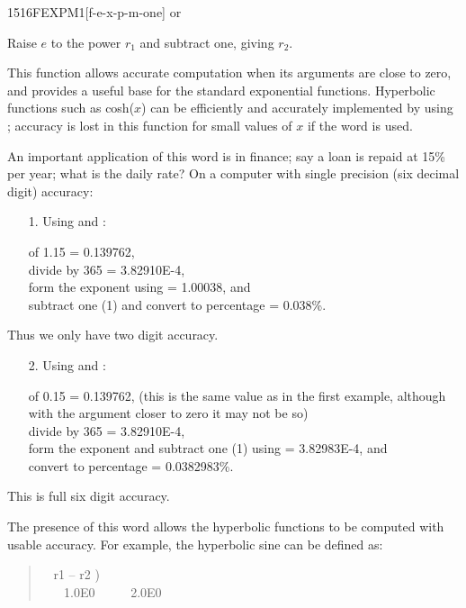 \begin{newword}{1516}{FEXPM1}[f-e-x-p-m-one]
	 or

	Raise $e$ to the power $r_1$ and subtract one, giving $r_2$.

	\begin{rationale} %
		This function allows accurate computation when its arguments
		are close to zero, and provides a useful base for the standard
		exponential functions. Hyperbolic functions such as
		\textsf{cosh($x$)} can be efficiently and accurately
		implemented by using ; accuracy is lost in this
		function for small values of $x$ if the word  is
		used.

		An important application of this word is in finance; say a loan
		is repaid at 15\% per year; what is the daily rate? On a computer
		with single precision (six decimal digit) accuracy:

		\begin{enumerate}
		\item[1.] Using  and :

			 of 1.15 = 0.139762, \\
			divide by 365 = 3.82910E-4, \\
			form the exponent using  = 1.00038, and \\
			subtract one (1) and convert to percentage = 0.038\%.
		\end{enumerate}
		Thus we only have two digit accuracy.
		\begin{enumerate}
		\item[2.] Using  and :

			 of 0.15 = 0.139762, (this is the same value
			as in the first example, although with the argument closer
			to zero it may not be so) \\
			divide by 365 = 3.82910E-4, \\
			form the exponent and subtract one (1) using
			 = 3.82983E-4, and \\
			convert to percentage = 0.0382983\%.
		\end{enumerate}
		This is full six digit accuracy.

		The presence of this word allows the hyperbolic functions to
		be computed with usable accuracy. For example, the hyperbolic
		sine can be defined as:

		\begin{quote}\ttfamily
			\word[core]{:} ~  r1 -- r2 ) \\
			\tab {}~ ~
				  1.0E0 \word{F+}~ ~ ~
				 2.0E0 
			\word[core]{;}
		\end{quote}
	\end{rationale}
\end{newword}


